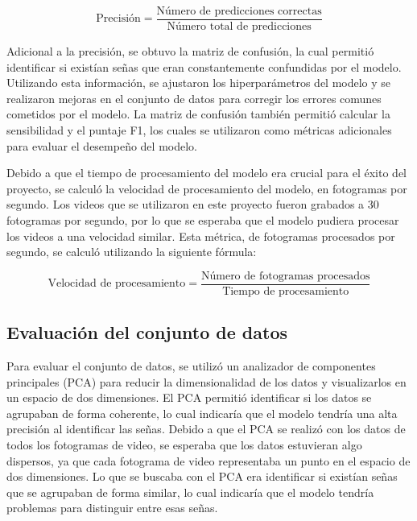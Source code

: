 \begin{equation}
    \text{Precisión} = \frac{\text{Número de predicciones correctas}}{\text{Número total de predicciones}}
\end{equation}

Adicional a la precisión, se obtuvo la matriz de confusión, la cual permitió identificar si existían señas que eran constantemente confundidas por el modelo.
Utilizando esta información, se ajustaron los hiperparámetros del modelo y se realizaron mejoras en el conjunto de datos para corregir los errores comunes cometidos por el modelo.
La matriz de confusión también permitió calcular la sensibilidad y el puntaje F1, los cuales se utilizaron como métricas adicionales para evaluar el desempeño del modelo.

Debido a que el tiempo de procesamiento del modelo era crucial para el éxito del proyecto, se calculó la velocidad de procesamiento del modelo, en fotogramas por segundo. 
Los videos que se utilizaron en este proyecto fueron grabados a 30 fotogramas por segundo, por lo que se esperaba que el modelo pudiera procesar los videos a una velocidad similar.
Esta métrica, de fotogramas procesados por segundo, se calculó utilizando la siguiente fórmula:

\begin{equation}
    \text{Velocidad de procesamiento} = \frac{\text{Número de fotogramas procesados}}{\text{Tiempo de procesamiento}}
\end{equation}

\subsection{Evaluación del conjunto de datos}
Para evaluar el conjunto de datos, se utilizó un analizador de componentes principales (PCA) para reducir la dimensionalidad de los datos y visualizarlos en un espacio de dos dimensiones.
El PCA permitió identificar si los datos se agrupaban de forma coherente, lo cual indicaría que el modelo tendría una alta precisión al identificar las señas.
Debido a que el PCA se realizó con los datos de todos los fotogramas de video, se esperaba que los datos estuvieran algo dispersos, ya que cada fotograma de video representaba un punto en el espacio de dos dimensiones.
Lo que se buscaba con el PCA era identificar si existían señas que se agrupaban de forma similar, lo cual indicaría que el modelo tendría problemas para distinguir entre esas señas.

